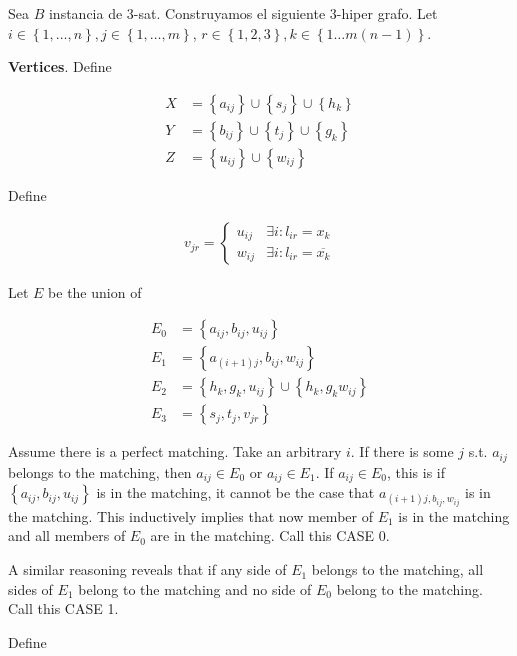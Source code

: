\documentclass[a4paper, 12pt]{article}
\begin{document}
Sea $B$ instancia de $3$-sat. Construyamos el siguiente $3$-hiper grafo. Let $i
\in \left\{ 1, \ldots, n \right\}, j \in \left\{ 1, \ldots, m \right\}  $, $r
\in \left\{ 1, 2, 3 \right\}, k \in \left\{ 1\ldots m(n-1) \right\}  $.

\textbf{Vertices}. Define 

\begin{align*}
    X &= \left\{ a_{ij} \right\}  \cup \left\{ s_j \right\} \cup \left\{ h_k \right\} \\ 
    Y &= \left\{ b_{ij} \right\} \cup \left\{ t_j \right\} \cup \left\{ g_k \right\} \\ 
    Z &= \left\{ u_{ij} \right\} \cup \left\{ w_{ij} \right\} 
\end{align*}

Define 

\begin{align*}
    v_{jr} = \begin{cases}
        u_{ij} & \exists  i : l_{ir} = x_k \\ 
        w_{ij} & \exists i : l_{ir} = \overline{x_k}
    \end{cases}
\end{align*}

Let $E$ be the union of 

\begin{align*}
    E_0 &= \left\{ a_{ij}, b_{ij}, u_{ij} \right\} \\ 
    E_1 &= \left\{ a_{(i+1)j}, b_{ij}, w_{ij} \right\} \\ 
    E_2 &= \left\{ h_k, g_k, u_{ij} \right\} \cup \left\{ h_k, g_k w_{ij} \right\} \\ 
    E_3 &= \left\{ s_j, t_j, v_{jr} \right\} 
\end{align*}

Assume there is a perfect matching. Take an arbitrary $i$.
If there is some $j$ s.t. $a_{ij}$ belongs to the matching, 
then $a_{ij} \in E_0$ or $a_{ij} \in E_1$. If $a_{ij} \in E_0$,
this is if $\left\{ a_{ij}, b_{ij}, u_{ij} \right\} $ is in the matching, 
it cannot be the case that $a_{(i+1)j, b_{ij}, w_{ij}}$ is in the matching.
This inductively implies that now member of $E_1$ is in the matching 
and all members of $E_0$ are in the matching. Call this CASE 0. 

A similar reasoning reveals that if any side of $E_1$ belongs to 
the matching, all sides of $E_1$ belong to the matching and no 
side of $E_0$ belong to the matching. Call this CASE 1. 

Define 
\end{document}
